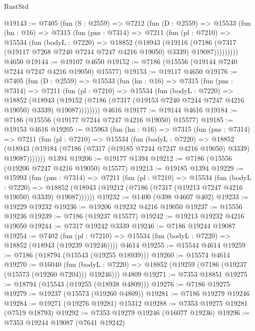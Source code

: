 \begin{lexlean}{RustStd}
\begin{coremodule}
@19143 := @7405
    (fun (S : @2559) =>
    @7212
      (fun (D : @2559) =>
      @15533
        (fun (hn : @16) =>
        @7315
          (fun (pns : @7314) =>
          @7211
            (fun (pl : @7210) =>
            @15534
              (fun (bodyL : @7220) =>
              @18852
                (@18943
                  (@19116
                    (@7186
                      (@7317 (@19117 @7268 @7240 @7244 @7247 @4216 @19050) @3339)
                      @19087)))))))))
    @4650
@19144 := @19107 @4650
@19152 := @7186 (@15556 (@19144 @7240 @7244 @7247 @4216 @19050) @15577)
@19153 := @19117 @4650
@19176 := @7405
    (fun (D : @2559) =>
    @15533
      (fun (hn : @16) =>
      @7315
        (fun (pns : @7314) =>
        @7211
          (fun (pl : @7210) =>
          @15534
            (fun (bodyL : @7220) =>
            @18852
              (@18943
                (@19152 (@7186 (@7317 (@19153 @7240 @7244 @7247 @4216 @19050) @3339) @19087))))))))
    @4616
@19177 := @19144 @4616
@19184 := @7186 (@15556 (@19177 @7244 @7247 @4216 @19050) @15577)
@19185 := @19153 @4616
@19205 := @15963
    (fun (hn : @16) =>
    @7315
      (fun (pns : @7314) =>
      @7211
        (fun (pl : @7210) =>
        @15534
          (fun (bodyL : @7220) =>
          @18852
            (@18943 (@19184 (@7186 (@7317 (@19185 @7244 @7247 @4216 @19050) @3339) @19087)))))))
    @1394
@19206 := @19177 @1394
@19212 := @7186 (@15556 (@19206 @7247 @4216 @19050) @15577)
@19213 := @19185 @1394
@19229 := @15993
    (fun (pns : @7314) =>
    @7211
      (fun (pl : @7210) =>
      @15534
        (fun (bodyL : @7220) =>
        @18852 (@18943 (@19212 (@7186 (@7317 (@19213 @7247 @4216 @19050) @3339) @19087))))))
@19232 := @1400 (@398 @4607 @402)
@19233 := @19229 @19232
@19236 := @19206 @19232 @4216 @19050
@19237 := @15556 @19236
@19239 := @7186 (@19237 @15577)
@19242 := @19213 @19232 @4216 @19050
@19244 := @7317 @19242 @3339
@19246 := @7186 @19244 @19087
@19254 := @7402
    (fun (pl : @7210) => @15534 (fun (bodyL : @7220) => @18852 (@18943 (@19239 @19246))))
    @4614
@19255 := @15544 @4614
@19259 := @7186 (@18794 (@15543 (@19255 @18939)))
@19260 := @15574 @4614
@19270 := @16040
    (fun (bodyL : @7220) => @18852 (@19259 (@7186 (@19237 (@15573 (@19260 @7204))) @19246)))
    @4809
@19271 := @7353 @18851
@19275 := @18794 (@15543 (@19255 (@18938 @4809)))
@19276 := @7186 @19275
@19279 := @19237 (@15573 (@19260 @4809))
@19281 := @7186 @19279 @19246
@19284 := @19271 (@19276 @19281) @15312
@19288 := @7353 @19275 @19281 (@7519 @18793)
@19292 := @7353 @19279 @19246 (@16077 @19236)
@19296 := @7353 @19244 @19087 (@7641 @19242)

\end{coremodule}
\end{lexlean}
